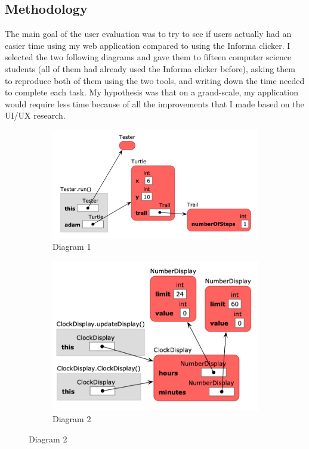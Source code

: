 \documentclass[]{usiinfbachelorproject}
\begin{document}
\subsection{Methodology}

The main goal of the user evaluation was to try to see if users actually had an easier time using my web application compared to using the Informa clicker. I selected the two following diagrams and gave them to fifteen computer science students (all of them had already used the Informa clicker before), asking them to reproduce both of them using the two tools, and writing down the time needed to complete each task. My hypothesis was that on a grand-scale, my application would require less time because of all the improvements that I made based on the UI/UX research.

\begin{figure}[h!]
\centering
\begin{subfigure}{.5\textwidth}
  \centering
  \includegraphics[width=\textwidth-10pt]{figures/informa_clicker_example2.png}
  \caption{Diagram 1}
\end{subfigure}%
\begin{subfigure}{.5\textwidth}
  \centering
  \includegraphics[width=\textwidth-10pt]{figures/informa_clicker_example4.png}
  \caption{Diagram 2}
\end{subfigure}
\label{fig:test}
\end{figure}
\end{document}
